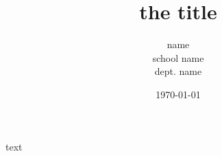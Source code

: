 \documentclass[12pt]{book}
\begin{document}
\title{the title}
\author{name \\
school name \\
dept. name
}
\date{\today}
\maketitle
text
\end{document}
